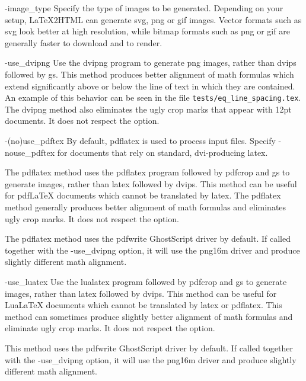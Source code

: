 \begin{htmllist}%
%
%
\item [ -image\_type \label{cs_image_type}]
Specify the type of images to be generated. Depending on your setup,
LaTeX2HTML can generate svg, png or gif images. Vector formats such as
svg look better at high resolution, while bitmap formats such as
png or gif are generally faster to download and to render.

%
\item [ -use\_dvipng \label{cs_use_dvipng}]
Use the dvipng program to generate png images, rather than
dvips followed by gs.  This method produces better alignment of
math formulas which extend significantly above or below
the line of text in which they are contained.  An example
of this behavior can be seen in the file \texttt{tests/eq\_line\_spacing.tex}.
The dvipng method also eliminates the ugly crop
marks that appear with 12pt documents.
It does not respect the  option.

%
\item [ -(no)use\_pdftex \label{cs_use_pdftex}]
  By default, pdflatex is used to process input files.
  Specify -nouse\_pdftex for documents that rely on
  standard, dvi-producing latex.

  The pdflatex method uses the pdflatex program followed by pdfcrop and gs to generate images,
rather than latex followed by dvips.  This method can be useful for
pdfLaTeX documents which cannot be translated by latex.
The pdflatex method generally produces better alignment
of math formulas and eliminates ugly crop marks.
It does not respect the  option.

The pdflatex method uses the pdfwrite GhostScript driver by default.
If called together with the -use\_dvipng option, it will use
the png16m driver and produce slightly different math alignment.

%
\item [ -use\_luatex \label{cs_use_luatex}]
Use the lualatex program followed by pdfcrop and gs to generate images,
rather than latex followed by dvips.  This method can be useful for
LuaLaTeX documents which cannot be translated by latex or pdflatex.
This method can sometimes produce slightly better alignment
of math formulas and eliminate ugly crop marks.
It does not respect the  option.

This method uses the pdfwrite GhostScript driver by default.
If called together with the -use\_dvipng option, it will use
the png16m driver and produce slightly different math alignment.


\end{htmllist}
